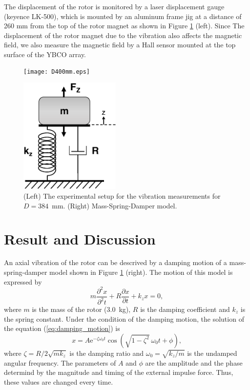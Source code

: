 \documentclass[a4paper]{jpconf}
\begin{document}
The displacement of the rotor is monitored by a laser displacement gauge (keyence LK-500),
which is mounted by an aluminum frame jig at a distance of 260 mm from the top of the rotor magnet as shown in Figure \ref{fig:d400} (left).
Since The displacement of the rotor magnet due to the vibration also affects the magnetic field,
we also measure the magnetic field by a Hall sensor mounted at the top surface of the YBCO array.

\begin{figure}[htbp]
  \centering
  \begin{minipage}{0.6\hsize}
    \texttt{[image: D400mm.eps]}
  \end{minipage}
  \begin{minipage}{0.3\hsize}
    \centering
    \includegraphics[width=50mm]{SpringSystem.eps}
  \end{minipage}
  \caption{(Left) The experimental setup for the vibration measurements for $D=384$~mm. (Right) Mass-Spring-Damper model.}
  \label{fig:d400}
\end{figure}


\section*{Result and Discussion}

An axial vibration of the rotor can be descrived by a damping motion of a mass-spring-damper model shown in Figure \ref{fig:d400} (right).
The motion of this model is expressed by
\begin{equation}
  m \frac{\partial^{2} x}{\partial^{2} t} + R \frac{\partial x}{\partial t} + k_{z} x = 0,
  \label{eq:damping_motion}
\end{equation}
where $m$ is the mass of the rotor (3.0~kg), $R$ is the damping coefficient and $k_{z}$ is the spring constant.
Under the condition of the damping motion, the solution of the equation (\ref{eq:damping_motion}) is
\begin{equation}
  x = A \mathrm{e}^{- \zeta \omega_{0} t} \cos( \sqrt{1 - \zeta^{2}} \ \omega_{0} t + \phi),
  \label{eq:damping}
\end{equation}
where $\zeta = R / 2 \sqrt{mk_{z}}$ is the damping ratio and $\omega_{0} = \sqrt{k_{z}/m}$ is the undamped angular frequency.
The parameters of $A$ and $\phi$ are the amplitude and the phase determind by the magnitude and timing of the external impulse force.
Thus, these values are changed every time.
\end{document}
